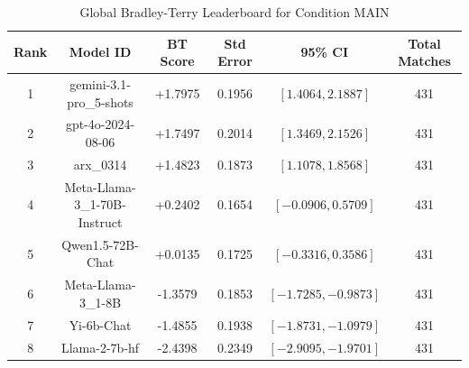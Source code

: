 \begin{table}[ht]
\centering
\caption{Global Bradley-Terry Leaderboard for Condition \textsc{MAIN}}
\label{tab:leaderboard_main}
\begin{tabular}{cccccc}
\hline
\textbf{Rank} & \textbf{Model ID} & \textbf{BT Score} & \textbf{Std Error} & \textbf{95\% CI} & \textbf{Total Matches} \\
\hline
1 & gemini-3.1-pro\_5-shots & +1.7975 & 0.1956 & $[1.4064, 2.1887]$ & 431 \\
2 & gpt-4o-2024-08-06 & +1.7497 & 0.2014 & $[1.3469, 2.1526]$ & 431 \\
3 & arx\_0314 & +1.4823 & 0.1873 & $[1.1078, 1.8568]$ & 431 \\
4 & Meta-Llama-3\_1-70B-Instruct & +0.2402 & 0.1654 & $[-0.0906, 0.5709]$ & 431 \\
5 & Qwen1.5-72B-Chat & +0.0135 & 0.1725 & $[-0.3316, 0.3586]$ & 431 \\
6 & Meta-Llama-3\_1-8B & -1.3579 & 0.1853 & $[-1.7285, -0.9873]$ & 431 \\
7 & Yi-6b-Chat & -1.4855 & 0.1938 & $[-1.8731, -1.0979]$ & 431 \\
8 & Llama-2-7b-hf & -2.4398 & 0.2349 & $[-2.9095, -1.9701]$ & 431 \\
\hline
\end{tabular}
\end{table}
